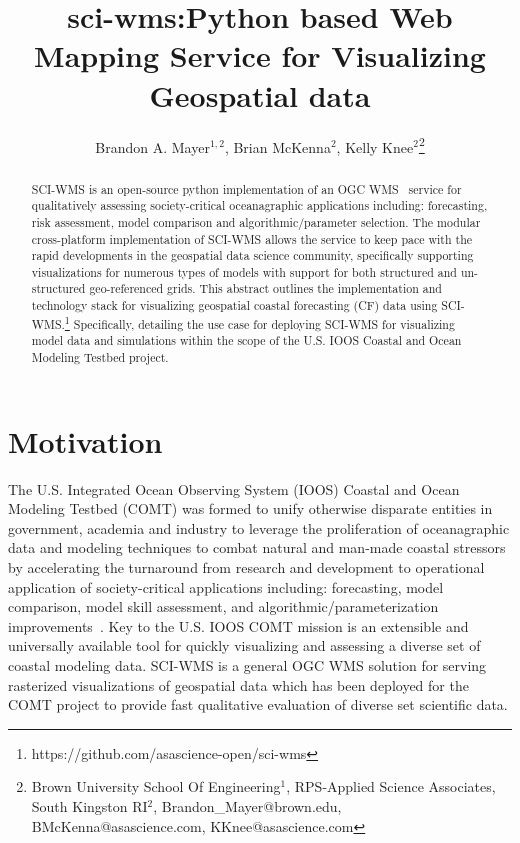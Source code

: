 \documentclass[11pt,twocolumn,twoside]{IEEEtran}
\newcommand{\comt}{COMT}
\newcommand{\ioos}{IOOS}
\newcommand{\ogc}{OGC}
\newcommand{\wms}{WMS}
\newcommand{\sciwms}{SCI-WMS}
\begin{document}
\title{\vspace{0.2in}\sc sci-wms:Python based Web Mapping Service for Visualizing Geospatial data}

\author{Brandon A. Mayer$^{1,2}$, Brian McKenna$^{2}$, Kelly Knee$^{2}$\thanks{Brown University School Of Engineering$^{1}$, RPS-Applied Science Associates, South Kingston RI$^{2}$, Brandon\_Mayer@brown.edu, BMcKenna@asascience.com, KKnee@asascience.com}}

\maketitle
\thispagestyle{fancy}

\begin{abstract}
\sciwms{} is an open-source python implementation of an \ogc{} \wms{}~\cite{wms14}
service for qualitatively assessing society-critical oceanagraphic
applications including: forecasting, risk assessment, model comparison
and algorithmic/parameter selection. The modular cross-platform
implementation of \sciwms{} allows the service to keep pace with the
rapid developments in the geospatial data science community,
specifically supporting visualizations for numerous types of models
with support for both structured and un-structured geo-referenced
grids. This abstract outlines the implementation and technology stack
for visualizing geospatial coastal forecasting (CF) data using
\sciwms{}.\footnote{https://github.com/asascience-open/sci-wms}
Specifically, detailing the use case for deploying \sciwms{} for
visualizing model data and simulations within the scope of the
U.S. \ioos{} Coastal and Ocean Modeling Testbed
project.~\cite{luettich13}
\end{abstract}

\section{Motivation}
The U.S. Integrated Ocean Observing System (\ioos{}) Coastal and Ocean
Modeling Testbed (\comt{}) was formed to unify otherwise disparate
entities in government, academia and industry to leverage the
proliferation of oceanagraphic data and modeling techniques to combat
natural and man-made coastal stressors by accelerating the turnaround
from research and development to operational application of
society-critical applications including: forecasting, model
comparison, model skill assessment, and algorithmic/parameterization
improvements~\cite{luettich13}. Key to the U.S. \ioos{} \comt{}
mission is an extensible and universally available tool for quickly
visualizing and assessing a diverse set of coastal modeling
data. \sciwms{} is a general \ogc{} \wms{} solution for serving
rasterized visualizations of geospatial data which has been deployed
for the \comt{} project to provide fast qualitative
evaluation of diverse set scientific data.
\end{document}
